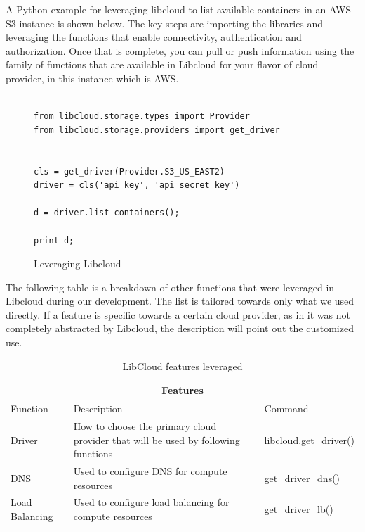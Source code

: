 A Python example for leveraging libcloud to list available containers in an AWS S3 
instance is shown below. The key steps are importing the libraries and leveraging the
functions that enable connectivity, authentication and authorization. Once that is 
complete, you can pull or push information using the family of functions that are 
available in Libcloud for your flavor of cloud provider, in this instance which is AWS.

\begin{figure}[htb]

\begin{verbatim}

from libcloud.storage.types import Provider
from libcloud.storage.providers import get_driver


cls = get_driver(Provider.S3_US_EAST2)
driver = cls('api key', 'api secret key')

d = driver.list_containers();

print d;

\end{verbatim}

\caption{Leveraging Libcloud \cite{hid-sp18-518-LibCloud}}\label{c:libcloud-example}

\end{figure}

The following table is a breakdown of other functions that were leveraged in Libcloud 
during our development. The list is tailored towards only what we used directly. If a 
feature is specific towards a certain cloud provider, as in it was not completely 
abstracted by Libcloud, the description will point out the customized use.
 
 \begin{table}[h!]
\caption{LibCloud features leveraged}
\begin{tabular}{ |p{3cm}||p{5cm}|p{3cm}| }
 \hline
 \multicolumn{3}{|c|}{Features} \\
 \hline
Function & Description & Command\\
 \hline
 Driver	& How to choose the primary cloud provider that will be used by following functions	& libcloud.get\_driver()\\
 DNS & Used to configure DNS for compute resources & get\_driver\_dns()\\
 Load Balancing & Used to configure load balancing for compute resources & get\_driver\_lb()\\
  \hline
 \end{tabular}
 \end{table}
 
